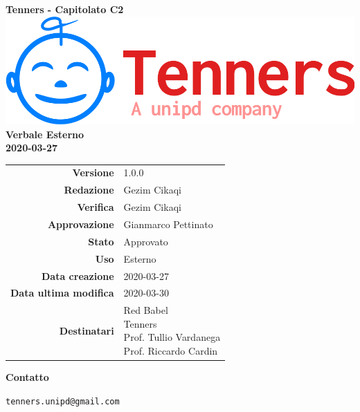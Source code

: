 \begin{titlepage}
	\begin{center}
		\large \textbf{Tenners - Capitolato C2}
		\vfill
		\includegraphics[scale = 0.3]{./res/img/logo.png}\\
		\vfill
		\Huge \textbf{Verbale Esterno} \\
		\textbf {2020-03-27}

        \vfill
        \large

        \begin{tabular}{r|l}
        	\textbf{Versione} & 1.0.0 \\
        	\textbf{Redazione} & Gezim Cikaqi \\
        	\textbf{Verifica} &  Gezim Cikaqi \\
        	\textbf{Approvazione} & Gianmarco Pettinato \\
        	\textbf{Stato} & Approvato \\
        	\textbf{Uso} &  Esterno\\
        	\textbf{Data creazione} &  2020-03-27\\
        	\textbf{Data ultima modifica} & 2020-03-30 \\
        	\textbf{Destinatari} & \parbox[t]{5cm}{Red Babel\\Tenners \\ Prof. Tullio Vardanega\\ Prof. Riccardo Cardin}
        \end{tabular}
    	\vfill
    	\normalsize
    	\vfill
    	\textbf{Contatto}

    	\texttt{tenners.unipd@gmail.com}

	\end{center}
\end{titlepage}
